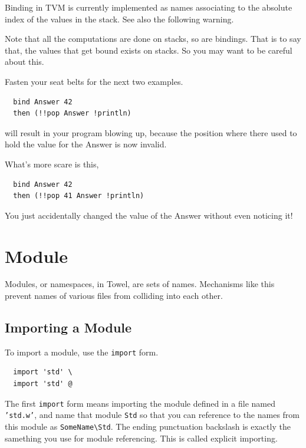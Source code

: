 \documentclass{report}
\newcommand{\mstd}[1]{\texttt{#1\textbackslash Std}}
\begin{document}
\begin{mdframed}[style=detail]
  Binding in TVM is currently implemented as names associating to the absolute index of the values in the stack. See also the following warning.
\end{mdframed}

\begin{mdframed}[style=warning]
Note that all the computations are done on stacks, so are bindings. That is to say that, the values that get bound exists on stacks. So you may want to be careful about this.

Fasten your seat belts for the next two examples.

\begin{verbatim}
  bind Answer 42
  then (!!pop Answer !println)
\end{verbatim}

will result in your program blowing up, because the position where there used to hold the value for the Answer is now invalid.

What's more scare is this,

\begin{verbatim}
  bind Answer 42
  then (!!pop 41 Answer !println)
\end{verbatim}

You just accidentally changed the value of the Answer without even noticing it!
\end{mdframed}

\section{Module}

Modules, or namespaces, in Towel, are sets of names. Mechanisms like this prevent names of various files from colliding into each other.

\subsection{Importing a Module}\label{ssec:import}

To import a module, use the \texttt{import} form.
\begin{mdframed}[style=example]
\begin{verbatim}
  import 'std' \
  import 'std' @
\end{verbatim}
\end{mdframed}

The first \texttt{import} form means importing the module defined in a file named \texttt{'std.w'}, and name that module \texttt{Std} so that you can reference to the names from this module as \mstd{SomeName}. The ending punctuation backslash is exactly the samething you use for module referencing. This is called explicit importing.
\end{document}
